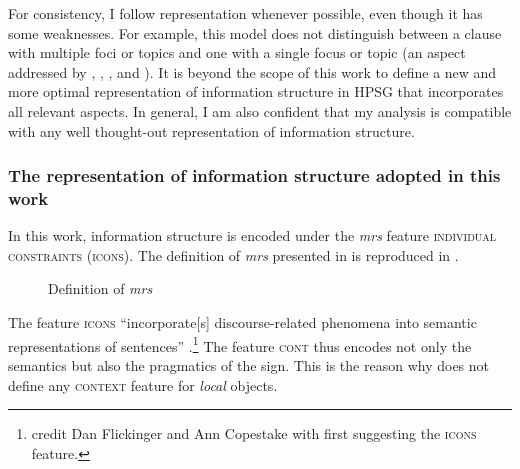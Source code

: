 For consistency, I follow  representation whenever possible, even though it has some weaknesses. For example, this model does not distinguish between a clause with multiple foci or topics and one with a single focus or topic (an aspect addressed by \citet{DeKuthy.2002}, \citet{Webelhuth.2007}, \citet{Bildhauer.2008}, and \citet*{Mueller.S.2020?.chapter5}). It is beyond the scope of this work to define a new and more optimal representation of information structure in HPSG that incorporates all relevant aspects. In general, I am also confident that my analysis is compatible with any well thought-out representation of information structure. 

\subsubsection{The representation of information structure adopted in this work}

In this work, information structure is encoded under the \emph{mrs} feature \textsc{individual constraints (icons)}. The definition of \emph{mrs} presented in  is reproduced in .

\begin{figure}[h]
\caption{Definition of \emph{mrs}}
\label{avm:def-mrs-bis}
\end{figure} 

The feature \textsc{icons} ``incorporate[s] discourse-related phenomena into semantic representations of sentences'' \citep[31]{Song.2016}.\footnote{\citet{Song.2012} credit Dan Flickinger and Ann Copestake with first suggesting the \textsc{icons} feature.} The feature \textsc{cont} thus encodes not only the semantics but also the pragmatics of the sign. This is the reason why \citet{Song.2016,Song.2017} does not define any \textsc{context} feature for \emph{local} objects. 

